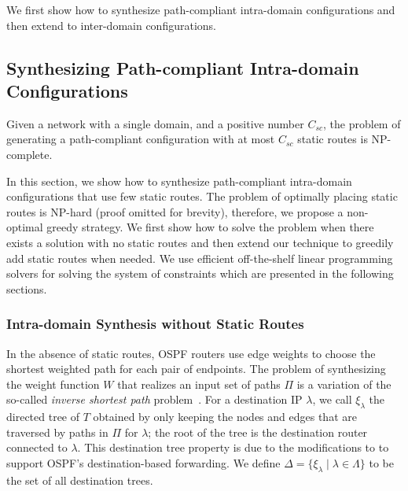 We first show how to synthesize 
path-compliant intra-domain 
configurations and then extend to
 inter-domain configurations.



\subsection{Synthesizing Path-compliant Intra-domain \\ Configurations} \label{sec:intra-synthesis}

\iffull
\begin{theorem}
\label{thm:ospfsynth}
Given a
network with a single domain,
and a positive number $C_{sc}$,
the problem of generating
a path-compliant configuration with at most $C_{sc}$ static routes
is NP-complete.
\end{theorem}

\fi

In this section, we show how to synthesize 
path-compliant  intra-domain configurations that
use few static routes.
The problem of optimally placing 
static routes is NP-hard (proof omitted for brevity), 
therefore, we propose a non-optimal greedy strategy.
We first show how to solve the problem when 
there exists a solution with no static routes
and then extend our technique to greedily 
add static routes when needed. We use 
efficient off-the-shelf linear programming 
solvers for solving the system of constraints 
which are presented in the following sections. 
	

\subsubsection{Intra-domain Synthesis without Static Routes} \label{sec:ospf}\hspace*{4mm}


 
In the absence of static routes,
OSPF routers use edge weights to choose the
shortest weighted path for each pair of endpoints. 
The problem of synthesizing the weight function $W$ that
realizes an input set of paths $\Pi$ is a
variation of the so-called {\em inverse shortest path} 
problem~\cite{isp}. 
For a destination IP $\lambda$, we call $\xi_\lambda$ 
the directed tree of $T$ 
obtained by only keeping the nodes and edges 
that are traversed by paths in $\Pi$ for 
$\lambda$; the root of the tree
is the destination router connected to $\lambda$. 
 This destination tree
 property is due to the modifications to \genesis
 to support OSPF's destination-based forwarding. We
 define $\Delta=\{\xi_\lambda\mid \lambda \in \Lambda\}$ to be 
the set of all destination trees. 

